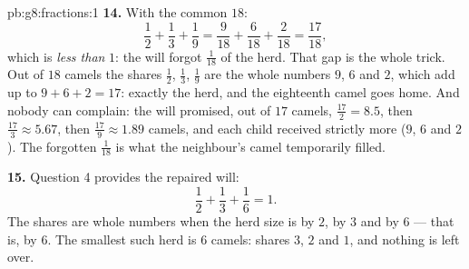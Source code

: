 \begin{solution}{pb:g8:fractions:1}
\textbf{14.} With the common  $18$:
\[
\frac12 + \frac13 + \frac19
= \frac{9}{18} + \frac{6}{18} + \frac{2}{18}
= \frac{17}{18} ,
\]
which is \emph{less than} $1$: the will forgot $\frac{1}{18}$ of
the herd. That gap is the whole trick. Out of $18$ camels the
shares $\frac12$, $\frac13$, $\frac19$ are the whole numbers $9$,
$6$ and $2$, which add up to $9 + 6 + 2 = 17$: exactly the herd,
and the eighteenth camel goes home. And nobody can complain: the
will promised, out of $17$ camels, $\frac{17}{2} = 8.5$, then
$\frac{17}{3} \approx 5.67$, then $\frac{17}{9} \approx 1.89$
camels, and each child received strictly more ($9$, $6$ and $2$).
The forgotten $\frac{1}{18}$ is what the neighbour's camel
temporarily filled.

\textbf{15.} Question 4 provides the repaired will:
\[
\frac12 + \frac13 + \frac16 = 1 .
\]
The shares are whole numbers when the herd size is  by
$2$, by $3$ and by $6$ --- that is,  by $6$. The
smallest such herd is $6$ camels: shares $3$, $2$ and $1$, and
nothing is left over.
\end{solution}
